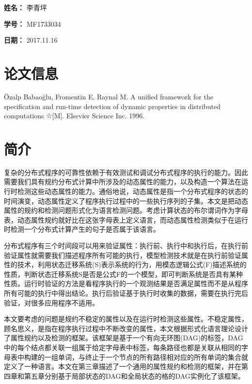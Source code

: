 \documentclass[UTF8]{article}
\begin{document}
    
{\flushleft \bf \Large 姓名：} 李青坪

{\flushleft \bf \Large 学号：} MF1733034

{\flushleft \bf \Large 日期：} 2017.11.16


\section*{论文信息}
    
Özalp Babaoğlu, Fromentin E, Raynal M. A unified framework for the specification and run-time detection of dynamic properties in distributed computations ☆[M]. Elsevier Science Inc. 1996.

    
\section{简介}

复杂的分布式程序的可靠性依赖于有效测试和调试分布式程序的执行的能力。因此需要我们具有规约分布式计算中所涉及的动态属性的能力，以及构造一个算法在运行时检测这些动态属性的能力。通俗地说，动态属性是指一个分布式程序的状态的时间演变，动态属性定义了程序执行过程中的一些执行序列的子集。本文是把动态属性的规约和检测问题形式化为语言检测问题。考虑计算状态的布尔谓词作为字母表，动态属性规约就好比在这张字母表上定义语言，而动态属性检测类似于在运行时检测一个分布式计算产生的句子是否属于该语言。

分布式程序有三个时间段可以用来验证属性：执行前、执行中和执行后，在执行前验证属性就需要我们描述程序所有可能的执行，模型检测技术就是在执行前验证属性的技术，利用状态迁移系统(S)表示系统的行为，用模态逻辑公式(F)描述系统的性质，判断状态迁移系统S是否是公式F的一个模型，即可判断系统是否具有某种性质。运行时验证的方法是看程序执行的一个观测结果是否满足属性而不是从程序所有可能的执行中得出结论。执行后验证基于执行时收集的数据，需要在执行完后验证，对很多应用程序不适用。

本文要考虑的问题是规约不稳定的属性以及在运行时检测这些属性。不稳定属性，顾名思义，是指在程序执行过程中不断改变的属性，本文根据形式化语言理论设计了属性规约以及检测的框架。该框架是基于一个有向无环图(DAG)的标签，DAG中的每个结点都关联一组属于给定字母表中标签，每条路径也都是关联从相同的字母表中构建的一组单词，与终止于一个节点的所有路径相对应的所有单词的集合就定义了一种语言。本文在第三章描述了一个通用的属性规约和检测的框架，并在第四章和第五章分别基于局部状态的DAG和全局状态的格的DAG实例化了该框架。
\end{document}
